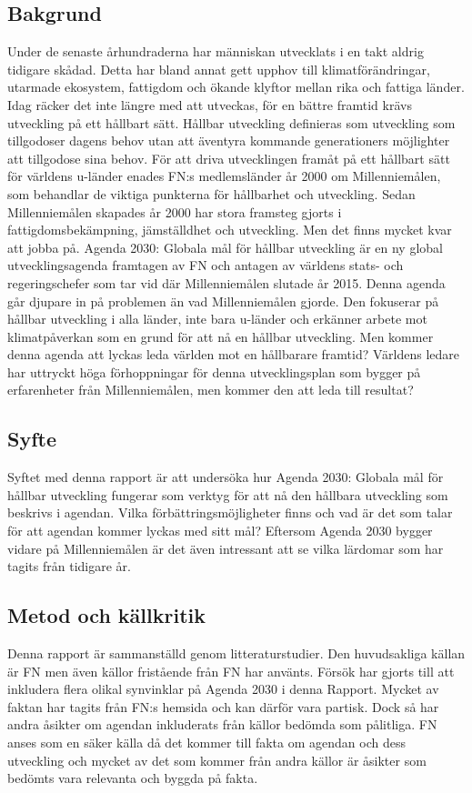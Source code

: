 \documentclass{report}
\begin{document}
\subsection{Bakgrund}
Under de senaste århundraderna har människan utvecklats i en takt aldrig tidigare skådad. Detta har bland annat gett upphov till klimatförändringar, utarmade ekosystem, fattigdom och ökande klyftor mellan rika och fattiga länder.\cite{webWWF} Idag räcker det inte längre med att utveckas, för en bättre framtid krävs utveckling på ett hållbart sätt. Hållbar utveckling definieras som utveckling som tillgodoser dagens behov utan att äventyra kommande generationers möjlighter att tillgodose sina behov.\cite{web2030agenda}
För att driva utvecklingen framåt på ett hållbart sätt för världens u-länder enades FN:s medlemsländer år 2000 om Millenniemålen, som behandlar de viktiga punkterna för hållbarhet och utveckling.  Sedan Millenniemålen skapades år 2000 har stora framsteg gjorts i fattigdomsbekämpning, jämställdhet och utveckling. Men det finns mycket kvar att jobba på. \cite{webEuropeanComission}
Agenda 2030: Globala mål för hållbar utveckling är en ny global utvecklingsagenda framtagen av FN och antagen av världens stats- och regeringschefer som tar vid där Millenniemålen slutade år 2015. Denna agenda går djupare in på problemen än vad Millenniemålen gjorde. Den fokuserar på hållbar utveckling i alla länder, inte bara u-länder och erkänner arbete mot klimatpåverkan som en grund för att nå en hållbar utveckling. Men kommer denna agenda att lyckas leda världen mot en hållbarare framtid? Världens ledare har uttryckt höga förhoppningar för denna utvecklingsplan som bygger på erfarenheter från Millenniemålen, men kommer den att leda till resultat?

\subsection{Syfte}
Syftet med denna rapport är att undersöka hur Agenda 2030: Globala mål för hållbar utveckling fungerar som verktyg för att nå den hållbara utveckling som beskrivs i agendan. Vilka förbättringsmöjligheter finns och vad är det som talar för att agendan kommer lyckas med sitt mål? Eftersom Agenda 2030 bygger vidare på Millenniemålen är det även intressant att se vilka lärdomar som har tagits från tidigare år.

\subsection{Metod och källkritik}
Denna rapport är sammanställd genom litteraturstudier. Den huvudsakliga källan är FN men även källor fristående från FN har använts. Försök har gjorts till att inkludera flera olikal synvinklar på Agenda 2030 i denna Rapport. Mycket av faktan har tagits från FN:s hemsida och kan därför vara partisk. Dock så har andra åsikter om agendan inkluderats från källor bedömda som pålitliga. FN anses som en säker källa då det kommer till fakta om agendan och dess utveckling och mycket av det som kommer från andra källor är åsikter som bedömts vara relevanta och byggda på fakta. 
\end{document}
